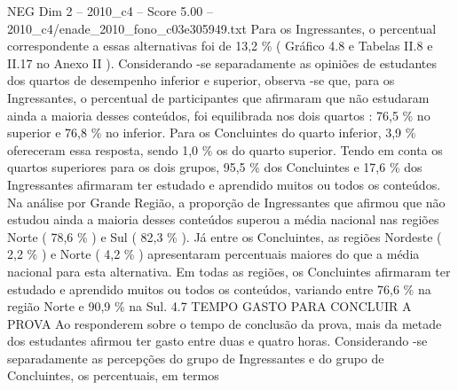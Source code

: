 \begin{textsample}{NEG Dim 2 – 2010\_c4 – Score 5.00 – 2010\_c4/enade\_2010\_fono\_c03e305949.txt}
Para os Ingressantes, o percentual correspondente a essas alternativas foi de 13,2 \% ( Gráfico 4.8 e Tabelas II.8 e II.17 no Anexo II ).
Considerando -se separadamente as opiniões de estudantes dos quartos de desempenho inferior e superior, observa -se que, para os Ingressantes, o percentual de participantes que afirmaram que não estudaram ainda a maioria desses conteúdos, foi equilibrada nos dois quartos : 76,5 \% no superior e 76,8 \% no inferior.
Para os Concluintes do quarto inferior, 3,9 \% ofereceram essa resposta, sendo 1,0 \% os do quarto superior.
Tendo em conta os quartos superiores para os dois grupos, 95,5 \% dos Concluintes e 17,6 \% dos Ingressantes afirmaram ter estudado e aprendido muitos ou todos os conteúdos.
Na análise por Grande Região, a proporção de Ingressantes que afirmou que não estudou ainda a maioria desses conteúdos superou a média nacional nas regiões Norte ( 78,6 \% ) e Sul ( 82,3 \% ).
Já entre os Concluintes, as regiões Nordeste ( 2,2 \% ) e Norte ( 4,2 \% ) apresentaram percentuais maiores do que a média nacional para esta alternativa.
Em todas as regiões, os Concluintes afirmaram ter estudado e aprendido muitos ou todos os conteúdos, variando entre 76,6 \% na região Norte e 90,9 \% na Sul. 4.7 TEMPO GASTO PARA CONCLUIR A PROVA Ao responderem sobre o tempo de conclusão da prova, mais da metade dos estudantes afirmou ter gasto entre duas e quatro horas.
Considerando -se separadamente as percepções do grupo de Ingressantes e do grupo de Concluintes, os percentuais, em termos

\end{textsample}
